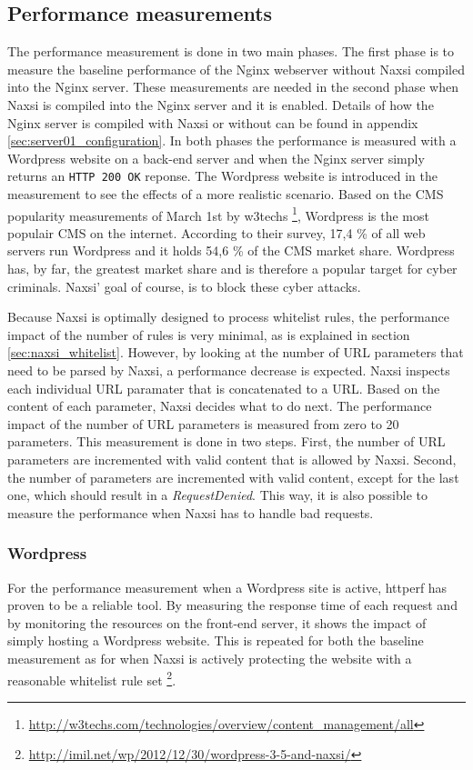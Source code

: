 \documentclass[Methods]{subfiles}
\begin{document}
\subsection{Performance measurements}
The performance measurement is done in two main phases. The first phase is to measure the baseline performance of the Nginx webserver without Naxsi compiled into the Nginx server. These measurements are needed in the second phase when Naxsi is compiled into the Nginx server and it is enabled. Details of how the Nginx server is compiled with Naxsi or without can be found in appendix \ref{sec:server01_configuration}. In both phases the performance is measured with a Wordpress website on a back-end server and when the Nginx server simply returns an \verb+HTTP 200 OK+ reponse. The Wordpress website is introduced in the measurement to see the effects of a more realistic scenario. Based on the \ac{CMS} popularity measurements of March 1st by w3techs \footnote{\url{http://w3techs.com/technologies/overview/content_management/all}}, Wordpress is the most populair \ac{CMS} on the internet. According to their survey, 17,4 \% of all web servers run Wordpress and it holds 54,6 \% of the CMS market share. Wordpress has, by far, the greatest market share and is therefore a popular target for cyber criminals. Naxsi' goal of course, is to block these cyber attacks.

Because Naxsi is optimally designed to process whitelist rules, the performance impact of the number of rules is very minimal, as is explained in section \ref{sec:naxsi_whitelist}. However, by looking at the number of \ac{URL} parameters that need to be parsed by Naxsi, a performance decrease is expected. Naxsi inspects each individual \ac{URL} paramater that is concatenated to a \ac{URL}. Based on the content of each parameter, Naxsi decides what to do next. The performance impact of the number of \ac{URL} parameters is measured from zero to 20 parameters. This measurement is done in two steps. First, the number of \ac{URL} parameters are incremented with valid content that is allowed by Naxsi. Second, the number of parameters are incremented with valid content, except for the last one, which should result in a \textit{RequestDenied}. This way, it is also possible to measure the performance when Naxsi has to handle bad requests.

\subsubsection{Wordpress}
For the performance measurement when a Wordpress site is active, httperf has proven to be a reliable tool. By measuring the response time of each request and by monitoring the resources on the front-end server, it shows the impact of simply hosting a Wordpress website. This is repeated for both the baseline measurement as for when Naxsi is actively protecting the website with a reasonable whitelist rule set \footnote{\url{http://imil.net/wp/2012/12/30/wordpress-3-5-and-naxsi/}}.
\end{document}
